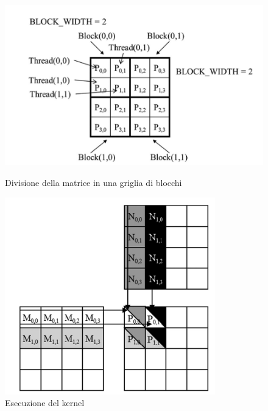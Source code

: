 \documentclass[a4paper]{article}
\begin{document}
\begin{figure}[H]
    \centering
    \begin{minipage}[b]{0.45\textwidth}
        \centering
        \includegraphics[width=\textwidth]{imgs/matrix_division.png}
        \caption{Divisione della matrice in una griglia di blocchi}
        \label{fig:1}
    \end{minipage}
    \hspace{0.05\textwidth}
    \begin{minipage}[b]{0.45\textwidth}
        \centering
        \includegraphics[width=\textwidth]{imgs/execution1.png}
        \caption{Esecuzione del kernel}
        \label{fig:2}
    \end{minipage}
\end{figure}
\end{document}
